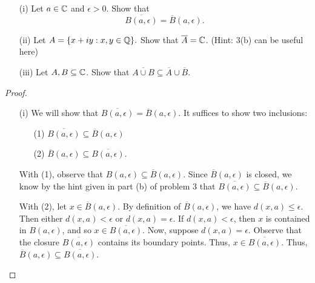 \documentclass[a4paper]{article}
\begin{document}
\begin{problem}
    \begin{enumerate}
        \item[(i)] Let \( a \in \mathbb{C}  \) and \( \epsilon > 0  \). Show that 
            \[  \overline{B(a,\epsilon)} = \overline{B}(a,\epsilon). \]
        \item[(ii)] Let \( A = \{ x + iy : x,y \in \mathbb{Q}  \}. \)
            Show that \( \overline{A} = \mathbb{C}  \). (Hint: 3(b) can be useful here)
        \item[(iii)] Let \( A,B \subseteq \mathbb{C}  \). Show that \( \overline{A \cup B} \subseteq  \overline{A} \cup \overline{B} \).
    \end{enumerate}
\end{problem}
\begin{proof}
\begin{enumerate}
    \item[(i)] We will show that \( \overline{B(a,\epsilon)} = \overline{B}(a,\epsilon) \). It suffices to show two inclusions:
        \begin{enumerate}
            \item[(1)] \( \overline{B(a,\epsilon)} \subseteq  \overline{B}(a,\epsilon) \)
            \item[(2)] \( \overline{B}(a,\epsilon) \subseteq  \overline{B(a,\epsilon)} \).
        \end{enumerate}
    With (1), observe that \( B(a,\epsilon) \subseteq \overline{B}(a,\epsilon) \). Since \( \overline{B}(a,\epsilon) \) is closed, we know by the hint given in part (b) of problem 3 that \( \overline{B(a,\epsilon)} \subseteq \overline{B}(a,\epsilon) \).
    
    With (2), let \( x \in \overline{B}(a,\epsilon) \). By definition of \( \overline{B}(a,\epsilon) \), we have \( d(x,a) \leq \epsilon \). Then either \( d(x,a) < \epsilon \) or \( d(x,a) = \epsilon \). If \( d(x,a) < \epsilon  \), then \( x  \) is contained in \( B(a,\epsilon) \), and so \( x \in \overline{B(a,\epsilon)} \). Now, suppose \( d(x,a) = \epsilon \). Observe that the closure \( \overline{B(a,\epsilon)} \) contains its boundary points. Thus, \( x \in \overline{B(a,\epsilon)} \). Thus, \( \overline{B}(a,\epsilon) \subseteq  \overline{B(a,\epsilon)} \). 


\end{enumerate}
\end{proof}
\end{document}
